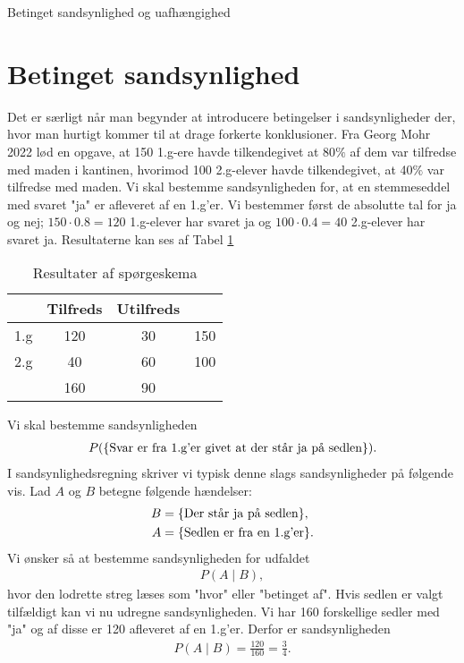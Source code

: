 \begin{center}
\Huge
Betinget sandsynlighed og uafhængighed
\end{center}
\section*{Betinget sandsynlighed}

Det er særligt når man begynder at introducere betingelser i sandsynligheder der, hvor man hurtigt kommer til at drage forkerte konklusioner. Fra Georg Mohr 2022 lød en opgave, at 150 1.g-ere havde tilkendegivet at 80$\%$ af dem var tilfredse med maden i kantinen, hvorimod 100 2.g-elever havde tilkendegivet, at 40$\%$ var tilfredse med maden. Vi skal bestemme sandsynligheden for, at en stemmeseddel med svaret "ja" er afleveret af en 1.g'er.
Vi bestemmer først de absolutte tal for ja og nej; $150\cdot 0.8 = 120$ 1.g-elever har svaret ja og $100\cdot 0.4 = 40$ 2.g-elever har svaret ja. Resultaterne kan ses af Tabel \ref{tab:resultater}
\begin{table}[H]
	\centering
	\begin{tabular}{cccc}
	 & Tilfreds & Utilfreds &\\
	 \toprule
	 1.g & 120 & 30 & 150 \\
	 2.g & 40 & 60 & 100 \\
	 \midrule
	 & 160 & 90 &
	\end{tabular}
	\caption{Resultater af spørgeskema}
	\label{tab:resultater}
\end{table}

Vi skal bestemme sandsynligheden
\begin{align*}
	P(\{ \textnormal{Svar er fra 1.g'er givet at der står ja på sedlen} \}).
\end{align*}
I sandsynlighedsregning skriver vi typisk denne slags sandsynligheder på følgende vis. Lad $A$ og $B$ betegne følgende hændelser:
\begin{align*}
	B &= \{ \textnormal{Der står ja på sedlen}\}, \\
	A &= \{ \textnormal{Sedlen er fra en 1.g'er} \}.
\end{align*}
Vi ønsker så at bestemme sandsynligheden for udfaldet 
\begin{align*}
	P(A \mid B),
\end{align*}
hvor den lodrette streg læses som "hvor" eller "betinget af".
Hvis sedlen er valgt tilfældigt kan vi nu udregne sandsynligheden. Vi har 160 forskellige sedler med "ja" og af disse er 120 afleveret af en 1.g'er. Derfor er sandsynligheden
\begin{align*}
	P(A \mid B) = \frac{120}{160} = \frac{3}{4}.
\end{align*}

